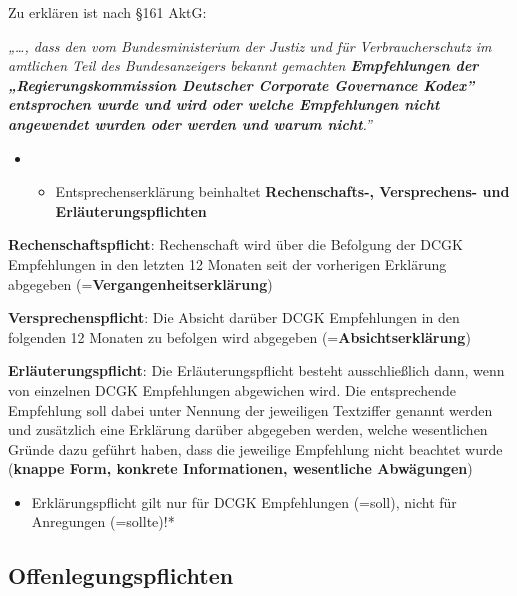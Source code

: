 \documentclass[
]{article}
\providecommand{\tightlist}{%
  \setlength{\itemsep}{0pt}\setlength{\parskip}{0pt}}
\begin{document}
Zu erklären ist nach §161 AktG:

\emph{„\ldots, dass den vom Bundesministerium der Justiz und für
Verbraucherschutz im amtlichen Teil des Bundesanzeigers bekannt
gemachten \textbf{Empfehlungen der „Regierungskommission Deutscher
Corporate Governance Kodex'' entsprochen wurde und wird oder welche
Empfehlungen nicht angewendet wurden oder werden und warum nicht}.''}

\begin{itemize}
\item
  \begin{itemize}
  \tightlist
  \item
    Entsprechenserklärung beinhaltet \textbf{Rechenschafts-,
    Versprechens- und Erläuterungspflichten}
  \end{itemize}
\end{itemize}

\textbf{Rechenschaftspflicht}: Rechenschaft wird über die Befolgung der
DCGK Empfehlungen in den letzten 12 Monaten seit der vorherigen
Erklärung abgegeben (=\textbf{Vergangenheitserklärung})

\textbf{Versprechenspflicht}: Die Absicht darüber DCGK Empfehlungen in
den folgenden 12 Monaten zu befolgen wird abgegeben
(=\textbf{Absichtserklärung})

\textbf{Erläuterungspflicht}: Die Erläuterungspflicht besteht
ausschließlich dann, wenn von einzelnen DCGK Empfehlungen abgewichen
wird. Die entsprechende Empfehlung soll dabei unter Nennung der
jeweiligen Textziffer genannt werden und zusätzlich eine Erklärung
darüber abgegeben werden, welche wesentlichen Gründe dazu geführt haben,
dass die jeweilige Empfehlung nicht beachtet wurde (\textbf{knappe Form,
konkrete Informationen, wesentliche Abwägungen})

\begin{itemize}
\tightlist
\item
  Erklärungspflicht gilt nur für DCGK Empfehlungen (=soll), nicht für
  Anregungen (=sollte)!*
\end{itemize}

\hypertarget{offenlegungspflichten}{%
\subsection{Offenlegungspflichten}\label{offenlegungspflichten}}
\end{document}
